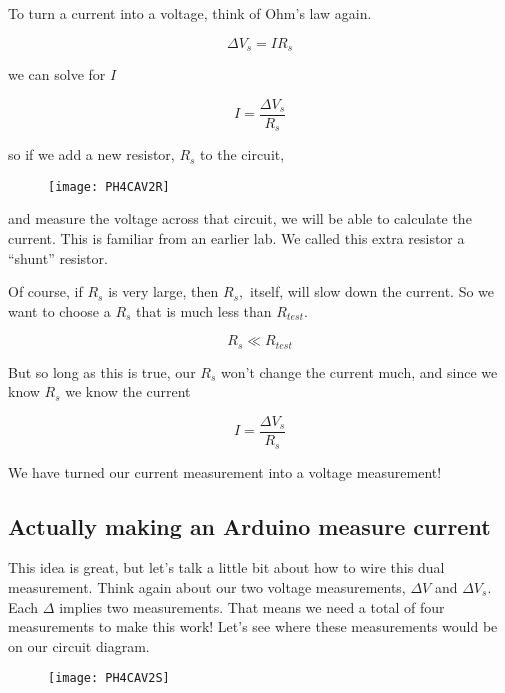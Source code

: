 To turn a current into a voltage, think of Ohm's law again.

\begin{equation*}
	\Delta V_{s}=IR_{s}
\end{equation*}

\noindent we can solve for $I$

\begin{equation*}
	I=\frac{\Delta V_{s}}{R_{s}}
\end{equation*}

\noindent so if we add a new resistor, $R_{s}$ to the circuit,

\begin{figure}[h!]
	\texttt{[image: PH4CAV2R]}
\end{figure}

\noindent and measure the voltage across that circuit, we will be able to calculate the current. This is familiar from an earlier lab. We called this extra resistor a ``shunt'' resistor.

Of course, if $R_{s}$ is very large, then $R_{s},$ itself, will slow down the current. So we want to choose a $R_{s}$ that is much less than $R_{test}. $

\begin{equation*}
	R_{s}\ll R_{test}
\end{equation*}

\noindent But so long as this is true, our $R_{s}$ won't change the current much, and since we know $R_{s}$ we know the current 

\begin{equation*}
	I=\frac{\Delta V_{s}}{R_{s}}
\end{equation*}

\noindent We have turned our current measurement into a voltage measurement!

\subsection{Actually making an Arduino measure current}

This idea is great, but let's talk a little bit about how to wire this dual measurement. Think again about our two voltage measurements, $\Delta V$ and $\Delta V_{s}.$ Each $\Delta $ implies two measurements. That means we need a total of four measurements to make this work! Let's see where these measurements would be on our circuit diagram.

\begin{figure}[h!]
	\centering
	\texttt{[image: PH4CAV2S]}
\end{figure}

